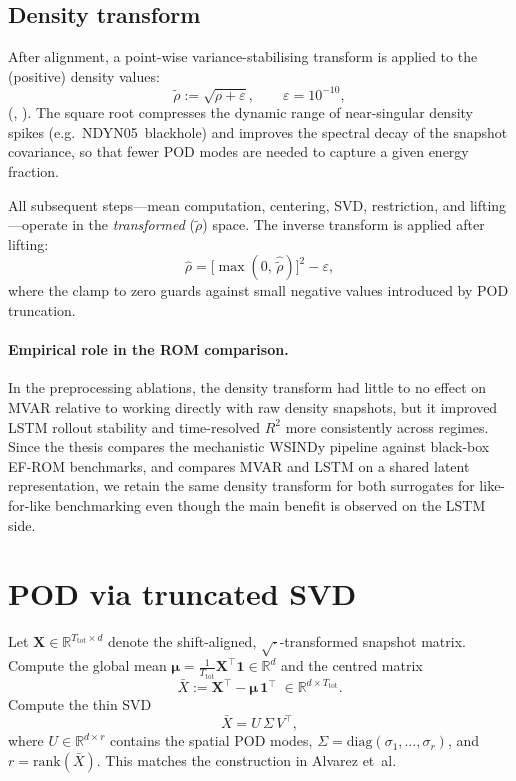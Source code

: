 \documentclass{report}
\theoremstyle{plain}
\theoremstyle{remark}
\numberwithin{equation}{section}              %
\begin{document}
\subsection{Density transform}
\label{subsec:density_transform}

After alignment, a point-wise variance-stabilising transform is applied to
the (positive) density values:
\begin{equation}
  \tilde{\rho} := \sqrt{\rho + \varepsilon},
  \qquad \varepsilon = 10^{-10},
  \label{eq:sqrt_transform}
\end{equation}
(, ).  The square
root compresses the dynamic range of near-singular density spikes (e.g.\
NDYN05~blackhole) and improves the spectral decay of the snapshot
covariance, so that fewer POD modes are needed to capture a given energy
fraction.

All subsequent steps---mean computation, centering, SVD, restriction, and
lifting---operate in the \emph{transformed} ($\tilde\rho$) space.  The
inverse transform is applied after lifting:
\begin{equation}
  \hat{\rho} = \bigl[\max(0,\,\hat{\tilde\rho})\bigr]^2 - \varepsilon,
  \label{eq:sqrt_inverse}
\end{equation}
where the clamp to zero guards against small negative values introduced by
POD truncation.

\paragraph{Empirical role in the ROM comparison.}
In the preprocessing ablations, the density transform had little to no
effect on MVAR relative to working directly with raw density snapshots, but
it improved LSTM rollout stability and time-resolved $R^2$ more
consistently across regimes.  Since the thesis compares the mechanistic
WSINDy pipeline against black-box EF-ROM benchmarks, and compares MVAR and
LSTM on a shared latent representation, we retain the same density
transform for both surrogates for like-for-like benchmarking even though
the main benefit is observed on the LSTM side.

%
\section{POD via truncated SVD}
\label{sec:pod_svd}

Let $\mathbf{X}\in\mathbb{R}^{T_{\mathrm{tot}}\times d}$ denote the
shift-aligned, $\sqrt{\cdot}$-transformed snapshot matrix.  Compute the
global mean $\boldsymbol{\mu}=\tfrac{1}{T_{\mathrm{tot}}}
\mathbf{X}^\top\mathbf{1}\in\mathbb{R}^d$ and the centred matrix
\[
  \bar{X} := \mathbf{X}^\top - \boldsymbol{\mu}\,\mathbf{1}^\top
  \;\in\mathbb{R}^{d\times T_{\mathrm{tot}}}.
\]
Compute the thin SVD
\[
  \bar{X} = U\,\Sigma\,V^\top,
\]
where $U\in\mathbb{R}^{d\times r}$ contains the spatial POD modes,
$\Sigma=\mathrm{diag}(\sigma_1,\dots,\sigma_r)$, and $r=\mathrm{rank}(\bar{X})$.
This matches the construction in Alvarez et~al.~\cite{alvarez2025eqfree}
\end{document}

